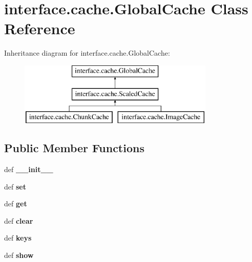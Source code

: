 \hypertarget{classinterface_1_1cache_1_1_global_cache}{\section{interface.\-cache.\-Global\-Cache \-Class \-Reference}
\label{classinterface_1_1cache_1_1_global_cache}
}
\-Inheritance diagram for interface.\-cache.\-Global\-Cache\-:\begin{figure}[H]
\begin{center}
\leavevmode
\includegraphics[height=3.000000cm]{classinterface_1_1cache_1_1_global_cache}
\end{center}
\end{figure}
\subsection*{\-Public \-Member \-Functions}
\begin{DoxyCompactItemize}
\item 
\hypertarget{classinterface_1_1cache_1_1_global_cache_a34b268830f3cfa197ec340c5460ceab7}{def {\bfseries \-\_\-\-\_\-init\-\_\-\-\_\-}}\label{classinterface_1_1cache_1_1_global_cache_a34b268830f3cfa197ec340c5460ceab7}

\item 
\hypertarget{classinterface_1_1cache_1_1_global_cache_ae65c7d3b274367f88bc8d8c0a72b931c}{def {\bfseries set}}\label{classinterface_1_1cache_1_1_global_cache_ae65c7d3b274367f88bc8d8c0a72b931c}

\item 
\hypertarget{classinterface_1_1cache_1_1_global_cache_ac8877671057ced93272ebe1e84d868f8}{def {\bfseries get}}\label{classinterface_1_1cache_1_1_global_cache_ac8877671057ced93272ebe1e84d868f8}

\item 
\hypertarget{classinterface_1_1cache_1_1_global_cache_ab01004f7ec7e95b4b06603a9634e836d}{def {\bfseries clear}}\label{classinterface_1_1cache_1_1_global_cache_ab01004f7ec7e95b4b06603a9634e836d}

\item 
\hypertarget{classinterface_1_1cache_1_1_global_cache_a604c489301634d518b3b38110a7c5ab9}{def {\bfseries keys}}\label{classinterface_1_1cache_1_1_global_cache_a604c489301634d518b3b38110a7c5ab9}

\item 
\hypertarget{classinterface_1_1cache_1_1_global_cache_a2ed92f5e3689115f4b75c605783ba6ee}{def {\bfseries show}}\label{classinterface_1_1cache_1_1_global_cache_a2ed92f5e3689115f4b75c605783ba6ee}

\end{DoxyCompactItemize}


